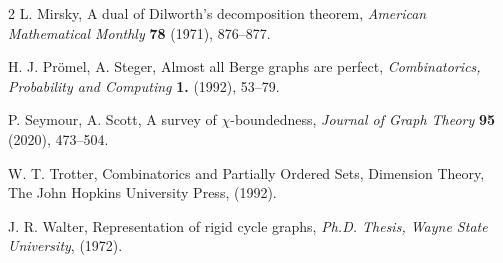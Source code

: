 \documentclass[12pt]{article}
\begin{document}
\begin{thebibliography}{2}
 L. Mirsky, A dual of Dilworth's decomposition theorem, {\em American Mathematical Monthly} {\bf 78} (1971), 876--877.

 H. J. Pr\"omel, A. Steger, Almost all Berge graphs are perfect, {\em Combinatorics, Probability and Computing} {\bf 1.} (1992), 53--79.

 P. Seymour, A. Scott, A survey of $\chi $-boundedness,  {\em Journal of  Graph Theory} {\bf 95} (2020), 473--504.

 W. T. Trotter, Combinatorics and Partially Ordered Sets, Dimension Theory, The John Hopkins University Press, (1992).

 J. R. Walter, Representation of rigid cycle graphs, {\em Ph.D. Thesis, Wayne State University}, (1972).
\end{thebibliography}
\end{document}
